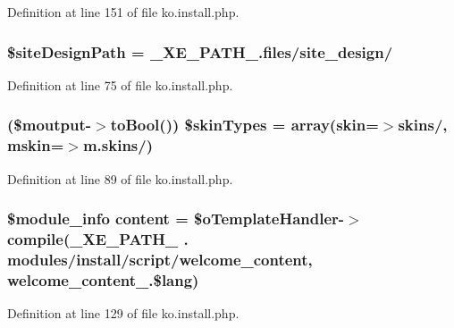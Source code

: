 Definition at line 151 of file ko.\+install.\+php.

\hypertarget{ko_8install_8php_a0b79a974b91157b79d83cc0be7e3247c}{}
\subsubsection[{\$site\+Design\+Path}]{\setlength{\rightskip}{0pt plus 5cm}\$site\+Design\+Path = \+\_\+\+X\+E\+\_\+\+P\+A\+T\+H\+\_\+.\textquotesingle{}files/site\+\_\+design/\textquotesingle{}}\label{ko_8install_8php_a0b79a974b91157b79d83cc0be7e3247c}


Definition at line 75 of file ko.\+install.\+php.

\hypertarget{ko_8install_8php_aa61073b7b359568eb3459da113fd8cdf}{}
\subsubsection[{\$skin\+Types}]{ (\$moutput-\/$>$to\+Bool()) \$skin\+Types = array(\textquotesingle{}skin\textquotesingle{}=$>$\textquotesingle{}skins/\textquotesingle{}, \textquotesingle{}mskin\textquotesingle{}=$>$\textquotesingle{}m.\+skins/\textquotesingle{})}\label{ko_8install_8php_aa61073b7b359568eb3459da113fd8cdf}


Definition at line 89 of file ko.\+install.\+php.

\hypertarget{ko_8install_8php_a65dddc3e5e47cb506e6b5417ffb3bdef}{}
\subsubsection[{content}]{\setlength{\rightskip}{0pt plus 5cm}\$module\+\_\+info {\bf content} = \$o\+Template\+Handler-\/$>$compile({\bf \+\_\+\+X\+E\+\_\+\+P\+A\+T\+H\+\_\+} . \textquotesingle{}modules/{\bf install}/script/welcome\+\_\+content\textquotesingle{}, \textquotesingle{}welcome\+\_\+content\+\_\+\textquotesingle{}.\$lang)}\label{ko_8install_8php_a65dddc3e5e47cb506e6b5417ffb3bdef}


Definition at line 129 of file ko.\+install.\+php.

